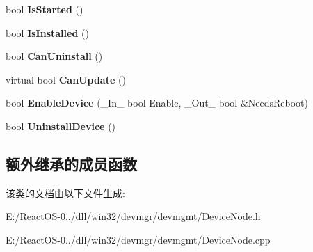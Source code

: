 \begin{DoxyCompactItemize}
\mbox{\label{class_c_device_node_a5f6c90fda8f2667e5961bc44a14829d3}} 
bool {\bfseries Is\+Started} ()
\item 
\mbox{\label{class_c_device_node_a3552e75cb816799f7b559a5dd707b8c2}} 
bool {\bfseries Is\+Installed} ()
\item 
\mbox{\label{class_c_device_node_a9af466d3884cd17d2df67d3a1c898ab9}} 
bool {\bfseries Can\+Uninstall} ()
\item 
\mbox{\label{class_c_device_node_a517962b3db060448c36baadb90fbed4c}} 
virtual bool {\bfseries Can\+Update} ()
\item 
\mbox{\label{class_c_device_node_ae682402546fbf837b66677e28732ca89}} 
bool {\bfseries Enable\+Device} (\+\_\+\+In\+\_\+ bool Enable, \+\_\+\+Out\+\_\+ bool \&Needs\+Reboot)
\item 
\mbox{\label{class_c_device_node_af5cd1d0a59027175c2b43dea6a36c413}} 
bool {\bfseries Uninstall\+Device} ()
\end{DoxyCompactItemize}
\subsection*{额外继承的成员函数}


该类的文档由以下文件生成\+:\begin{DoxyCompactItemize}
\item 
E\+:/\+React\+O\+S-\/0../dll/win32/devmgr/devmgmt/Device\+Node.\+h\item 
E\+:/\+React\+O\+S-\/0../dll/win32/devmgr/devmgmt/Device\+Node.\+cpp\end{DoxyCompactItemize}

